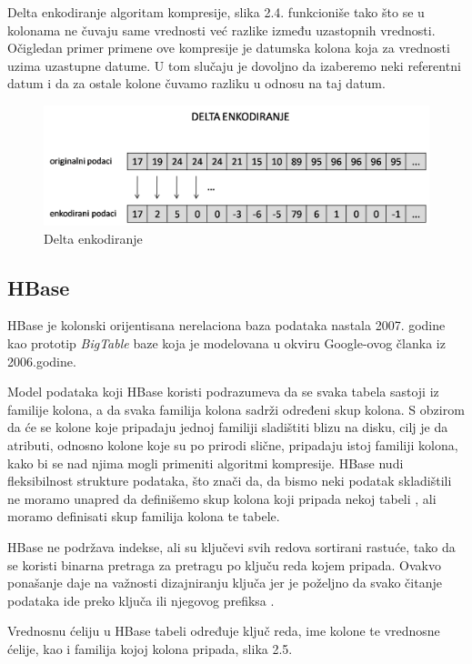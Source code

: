 \documentclass[12pt,oneside]{memoir}
\begin{document}
Delta enkodiranje algoritam kompresije, slika 2.4. funkcioniše tako što se u kolonama ne čuvaju same vrednosti već razlike između uzastopnih vrednosti. Očigledan primer primene ove kompresije je datumska kolona koja za vrednosti uzima uzastupne datume. U tom slučaju  je dovoljno da izaberemo neki referentni datum i da za ostale kolone čuvamo razliku u odnosu na taj datum.

\begin{figure}[!ht]
  \centering
  \includegraphics[width=1\textwidth]{delta-encoding.png}
  \caption{Delta enkodiranje}
  \label{fig:grafikon}
\end{figure}

\subsection{HBase}

HBase je kolonski orijentisana nerelaciona baza podataka nastala 2007. godine kao prototip \textit{BigTable} baze koja je modelovana u okviru Google-ovog članka iz 2006.godine\cite{BigTable}. 

Model podataka koji HBase koristi podrazumeva da se svaka tabela sastoji iz familije kolona, a da svaka familija kolona sadrži određeni skup kolona.  S obzirom da će se kolone koje pripadaju jednoj familiji sladištiti blizu na disku, cilj je da atributi, odnosno kolone koje su po prirodi slične, pripadaju istoj familiji kolona, kako bi se nad njima mogli primeniti algoritmi kompresije. HBase nudi fleksibilnost strukture podataka, što znači da, da bismo neki podatak skladištili ne moramo unapred da definišemo skup kolona koji pripada nekoj tabeli , ali moramo definisati skup familija kolona te tabele.

HBase ne podržava indekse, ali su ključevi svih redova sortirani rastuće, tako da se koristi binarna pretraga za pretragu po ključu reda kojem pripada. Ovakvo ponašanje daje na važnosti dizajniranju ključa jer je poželjno da svako čitanje podataka ide preko ključa ili njegovog prefiksa \cite{hbaseSchema}. 

Vrednosnu ćeliju u HBase tabeli određuje ključ reda, ime kolone te vrednosne ćelije, kao i familija kojoj kolona pripada, slika 2.5.
\end{document}

